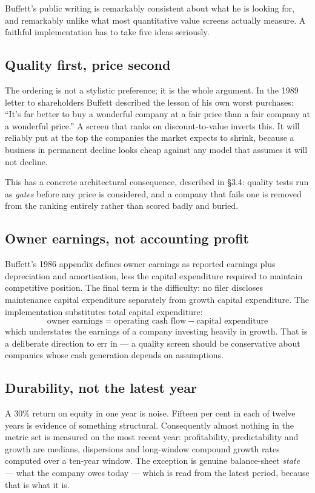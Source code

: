 \documentclass[11pt,a4paper]{article}
\begin{document}
Buffett's public writing is remarkably consistent about what he is looking for,
and remarkably unlike what most quantitative value screens actually measure. A
faithful implementation has to take five ideas seriously.

\subsection{Quality first, price second}

The ordering is not a stylistic preference; it is the whole argument. In the
1989 letter to shareholders Buffett described the lesson of his own worst
purchases: ``It's far better to buy a wonderful company at a fair price than a
fair company at a wonderful price.'' A screen that ranks on discount-to-value
inverts this. It will reliably put at the top the companies the market expects
to shrink, because a business in permanent decline looks cheap against any
model that assumes it will not decline.

This has a concrete architectural consequence, described in \S3.4: quality
tests run as \emph{gates} before any price is considered, and a company that
fails one is removed from the ranking entirely rather than scored badly and
buried.

\subsection{Owner earnings, not accounting profit}

Buffett's 1986 appendix defines owner earnings as reported earnings plus
depreciation and amortisation, less the capital expenditure required to
maintain competitive position. The final term is the difficulty: no filer
discloses maintenance capital expenditure separately from growth capital
expenditure. The implementation substitutes total capital expenditure:
\[
\text{owner earnings} = \text{operating cash flow} - \text{capital expenditure}
\]
which understates the earnings of a company investing heavily in growth. That
is a deliberate direction to err in --- a quality screen should be conservative
about companies whose cash generation depends on assumptions.

\subsection{Durability, not the latest year}

A 30\% return on equity in one year is noise. Fifteen per cent in each of
twelve years is evidence of something structural. Consequently almost nothing
in the metric set is measured on the most recent year: profitability,
predictability and growth are medians, dispersions and long-window compound
growth rates computed over a ten-year window. The exception is genuine
balance-sheet \emph{state} --- what the company owes today --- which is read
from the latest period, because that is what it is.
\end{document}
